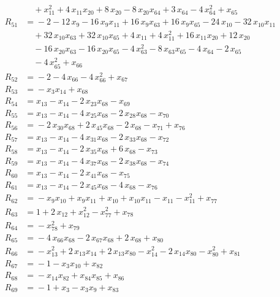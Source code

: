 \begin{align*}
&\quad{} +x_{11}^{2} +4\,x_{11} x_{20} +8\,x_{20} -8\,x_{20} x_{64} +3\,x_{64} -4\,x_{64}^{2} +x_{65} \\[2pt]
R_{51} &={} -2 -12\,x_{9} -16\,x_{9} x_{11} +16\,x_{9} x_{63} +16\,x_{9} x_{65} -24\,x_{10} -32\,x_{10} x_{11} \\
&\quad{} +32\,x_{10} x_{63} +32\,x_{10} x_{65} +4\,x_{11} +4\,x_{11}^{2} +16\,x_{11} x_{20} +12\,x_{20} \\
&\quad{} -16\,x_{20} x_{63} -16\,x_{20} x_{65} -4\,x_{63}^{2} -8\,x_{63} x_{65} -4\,x_{64} -2\,x_{65} \\
&\quad{} -4\,x_{65}^{2} +x_{66} \\[2pt]
R_{52} &={} -2 -4\,x_{66} -4\,x_{66}^{2} +x_{67} \\[2pt]
R_{53} &={} -x_{3} x_{14} +x_{68} \\[2pt]
R_{54} &={} x_{13} -x_{14} -2\,x_{23} x_{68} -x_{69} \\[2pt]
R_{55} &={} x_{13} -x_{14} -4\,x_{25} x_{68} -2\,x_{28} x_{68} -x_{70} \\[2pt]
R_{56} &={} -2\,x_{30} x_{68} +2\,x_{45} x_{68} -2\,x_{68} -x_{71} +x_{76} \\[2pt]
R_{57} &={} x_{13} -x_{14} -4\,x_{31} x_{68} -2\,x_{33} x_{68} -x_{72} \\[2pt]
R_{58} &={} x_{13} -x_{14} -2\,x_{35} x_{68} +6\,x_{68} -x_{73} \\[2pt]
R_{59} &={} x_{13} -x_{14} -4\,x_{37} x_{68} -2\,x_{38} x_{68} -x_{74} \\[2pt]
R_{60} &={} x_{13} -x_{14} -2\,x_{41} x_{68} -x_{75} \\[2pt]
R_{61} &={} x_{13} -x_{14} -2\,x_{45} x_{68} -4\,x_{68} -x_{76} \\[2pt]
R_{62} &={} -x_{9} x_{10} +x_{9} x_{11} +x_{10} +x_{10} x_{11} -x_{11} -x_{11}^{2} +x_{77} \\[2pt]
R_{63} &={} 1 +2\,x_{12} +x_{12}^{2} -x_{77}^{2} +x_{78} \\[2pt]
R_{64} &={} -x_{78}^{2} +x_{79} \\[2pt]
R_{65} &={} -4\,x_{66} x_{68} -2\,x_{67} x_{68} +2\,x_{68} +x_{80} \\[2pt]
R_{66} &={} -x_{13}^{2} +2\,x_{13} x_{14} +2\,x_{13} x_{80} -x_{14}^{2} -2\,x_{14} x_{80} -x_{80}^{2} +x_{81} \\[2pt]
R_{67} &={} -1 -x_{3} x_{10} +x_{82} \\[2pt]
R_{68} &={} -x_{14} x_{82} +x_{84} x_{85} +x_{86} \\[2pt]
R_{69} &={} -1 +x_{3} -x_{3} x_{9} +x_{83} \\[2pt]

\end{align*}
